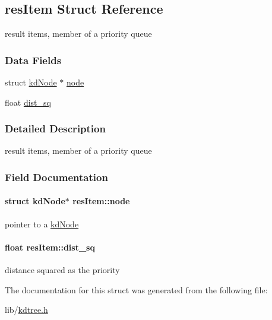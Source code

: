 \hypertarget{structresItem}{
\subsection{resItem Struct Reference}
\label{structresItem}
}
result items, member of a priority queue  


\subsubsection*{Data Fields}
\begin{CompactItemize}
\item 
struct \hyperlink{structkdNode}{kdNode} $\ast$ \hyperlink{structresItem_b595fe3d92834eac1a76156afd908c38}{node}
\item 
float \hyperlink{structresItem_7f098ba8149db2cab73261e0b02ad73d}{dist\_\-sq}
\end{CompactItemize}


\subsubsection{Detailed Description}
result items, member of a priority queue 

\subsubsection{Field Documentation}
\hypertarget{structresItem_b595fe3d92834eac1a76156afd908c38}{
\paragraph[node]{\setlength{\rightskip}{0pt plus 5cm}struct {\bf kdNode}$\ast$ {\bf resItem::node}}\hfill}
\label{structresItem_b595fe3d92834eac1a76156afd908c38}


pointer to a \hyperlink{structkdNode}{kdNode} \hypertarget{structresItem_7f098ba8149db2cab73261e0b02ad73d}{
\paragraph[dist\_\-sq]{\setlength{\rightskip}{0pt plus 5cm}float {\bf resItem::dist\_\-sq}}\hfill}
\label{structresItem_7f098ba8149db2cab73261e0b02ad73d}


distance squared as the priority 

The documentation for this struct was generated from the following file:\begin{CompactItemize}
\item 
lib/\hyperlink{kdtree_8h}{kdtree.h}\end{CompactItemize}
